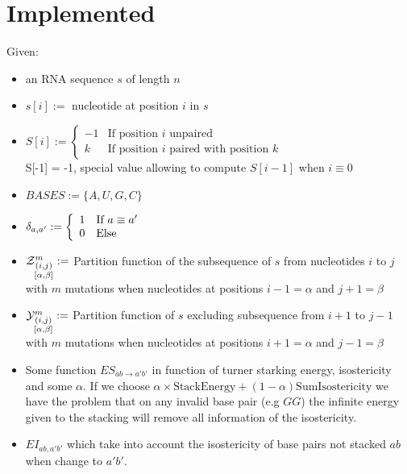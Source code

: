 \documentclass[11pt]{article} %
\begin{document}
\section{Implemented}
Given:
\begin{itemize}
	\item an RNA sequence $s$ of length $n$
	\item $s[i]:=$ nucleotide at position $i$ in $s$
	\item $\displaystyle
		S[i]:=\left\{
		\begin{array}{rl}
			-1 & \text{If position }i \text{ unpaired}\\
	 		k  & \text{If position }i \text{ paired with position }k
		\end{array}\right.
		$\\
		S[-1] = -1, special value allowing to compute $S[i-1]$ when $i\equiv 0$
	\item $BASES:=\{A, U, G, C\}$
	\item $ \delta_{a,a'}:=\left\{
		\begin{array}{ll}
			1 &\text{If }a \equiv a'\\
			0 &\text{Else}
		\end{array}\right.$
	\item $\Z{i,j}{m}{\alpha,\beta}:=$ Partition function of the subsequence of $s$ from nucleotides 
	$i$ to $j$ with $m$ mutations when nucleotides at positions $i-1=\alpha$ and $j+1=\beta$
	\item $\Y{i,j}{m}{\alpha,\beta}:=$ Partition function of $s$ excluding subsequence  from $i+1$ to 
	$j-1$ with $m$ mutations when nucleotides at positions $i+1=\alpha$ and $j-1=\beta$ 	
	\item Some function $ES_{ab \to a'b'}$ in function of turner starking energy, isostericity and
	  	some $\alpha$. If we choose $\alpha\times\text{StackEnergy} + (1-\alpha)\text{SumIsostericity}$ 
		we 	have the problem that on any invalid base pair (e.g $GG$) the infinite energy given to the 
		stacking 	will remove all information of the isostericity. 
	\item $EI_{ab,a'b'}$ which take into account the isostericity of base pairs not stacked $ab$ when 
	change to $a'b'$.
\end{itemize}
	
	
\end{document}

